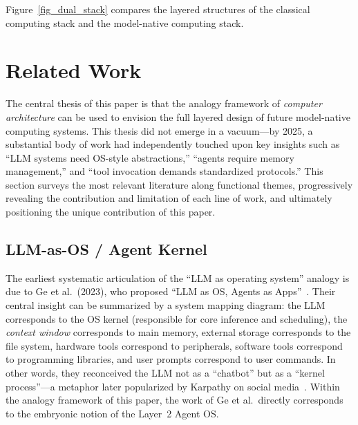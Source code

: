 \documentclass[11pt,a4paper]{article}
\begin{document}
Figure~\ref{fig_dual_stack} compares the layered structures of the classical computing stack and the model-native computing stack.





\section{Related Work}
\label{sec:related}

The central thesis of this paper is that the analogy framework of \textit{computer architecture} can be used to envision the full layered design of future model-native computing systems.
This thesis did not emerge in a vacuum---by 2025, a substantial body of work had independently touched upon key insights such as ``LLM systems need OS-style abstractions,'' ``agents require memory management,'' and ``tool invocation demands standardized protocols.''
This section surveys the most relevant literature along functional themes, progressively revealing the contribution and limitation of each line of work, and ultimately positioning the unique contribution of this paper.

\subsection{LLM-as-OS / Agent Kernel}
\label{sec:related-llmos}

The earliest systematic articulation of the ``LLM as operating system'' analogy is due to Ge et al.\ (2023), who proposed ``LLM as OS, Agents as Apps''~\cite{ge2023llmos}.
Their central insight can be summarized by a system mapping diagram: the LLM corresponds to the OS kernel (responsible for core inference and scheduling), the \textit{context window} corresponds to main memory, external storage corresponds to the file system, hardware tools correspond to peripherals, software tools correspond to programming libraries, and user prompts correspond to user commands.
In other words, they reconceived the LLM not as a ``chatbot'' but as a ``kernel process''---a metaphor later popularized by Karpathy on social media~\cite{karpathy2023llmos}.
Within the analogy framework of this paper, the work of Ge et al.\ directly corresponds to the embryonic notion of the Layer~2 Agent OS.
\end{document}
